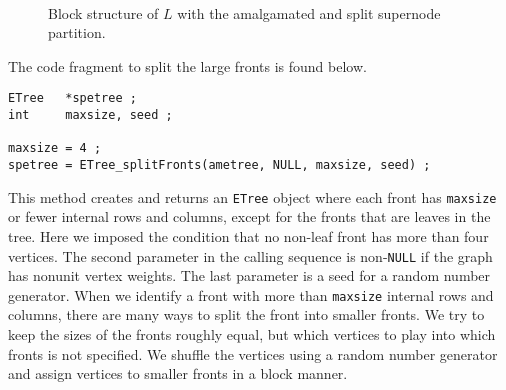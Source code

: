 \par
\begin{figure}[htbp]
\caption{Block structure of $L$ with the amalgamated and split
         supernode partition.}
\label{fig:sp-mtx}
\begin{center}
\mbox{
}
\end{center}
\end{figure}
\par
The code fragment to split the large fronts is found below.
\begin{verbatim}
ETree   *spetree ;
int     maxsize, seed ;

maxsize = 4 ;
spetree = ETree_splitFronts(ametree, NULL, maxsize, seed) ;
\end{verbatim}
This method creates and returns an {\tt ETree} object where each front
has {\tt maxsize} or fewer internal rows and columns, except for the
fronts that are leaves in the tree.
Here we imposed the condition that no non-leaf front has more than four
vertices.
The second parameter in the calling sequence is non-{\tt NULL} 
if the graph has nonunit vertex weights.
The last parameter is a seed for a random number generator.
When we identify a front with more than {\tt maxsize} internal rows and
columns, there are many ways to split the front into smaller fronts.
We try to keep the sizes of the fronts roughly equal, but which vertices
to play into which fronts is not specified.
We shuffle the vertices using a random number generator and assign
vertices to smaller fronts in a block manner.
\par
